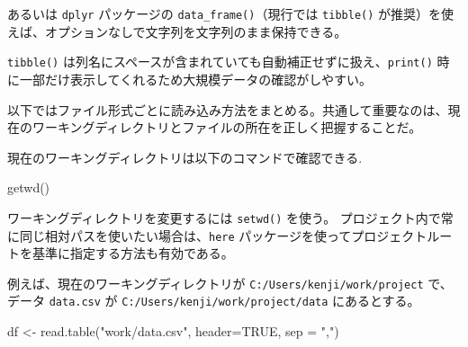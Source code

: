 \documentclass[
  letterpaper,
  xelatex,
  ja=standard, xelatex]{bxjsbook}
\newenvironment{Shaded}{\begin{snugshade}}{\end{snugshade}}
\newcommand{\AttributeTok}[1]{\textcolor[rgb]{0.40,0.45,0.13}{#1}}
\newcommand{\ConstantTok}[1]{\textcolor[rgb]{0.56,0.35,0.01}{#1}}
\newcommand{\DecValTok}[1]{\textcolor[rgb]{0.68,0.00,0.00}{#1}}
\newcommand{\DocumentationTok}[1]{\textcolor[rgb]{0.37,0.37,0.37}{\textit{#1}}}
\newcommand{\FunctionTok}[1]{\textcolor[rgb]{0.28,0.35,0.67}{#1}}
\newcommand{\NormalTok}[1]{\textcolor[rgb]{0.00,0.23,0.31}{#1}}
\newcommand{\OtherTok}[1]{\textcolor[rgb]{0.00,0.23,0.31}{#1}}
\newcommand{\SpecialCharTok}[1]{\textcolor[rgb]{0.37,0.37,0.37}{#1}}
\newcommand{\StringTok}[1]{\textcolor[rgb]{0.13,0.47,0.30}{#1}}
\begin{document}
あるいは \texttt{dplyr} パッケージの \texttt{data\_frame()}（現行では
\texttt{tibble()}
が推奨）を使えば、オプションなしで文字列を文字列のまま保持できる。

\begin{Shaded}
\end{Shaded}

\texttt{tibble()}
は列名にスペースが含まれていても自動補正せずに扱え、\texttt{print()}
時に一部だけ表示してくれるため大規模データの確認がしやすい。

以下ではファイル形式ごとに読み込み方法をまとめる。共通して重要なのは、現在のワーキングディレクトリとファイルの所在を正しく把握することだ。

現在のワーキングディレクトリは以下のコマンドで確認できる.

\begin{Shaded}
\begin{Highlighting}[]
\FunctionTok{getwd}\NormalTok{()}
\end{Highlighting}
\end{Shaded}

ワーキングディレクトリを変更するには \texttt{setwd()} を使う。
プロジェクト内で常に同じ相対パスを使いたい場合は、\texttt{here}
パッケージを使ってプロジェクトルートを基準に指定する方法も有効である。

例えば、現在のワーキングディレクトリが
\texttt{C:/Users/kenji/work/project} で、データ \texttt{data.csv} が
\texttt{C:/Users/kenji/work/project/data} にあるとする。

\begin{Shaded}
\begin{Highlighting}[]
\NormalTok{df }\OtherTok{\textless{}{-}} \FunctionTok{read.table}\NormalTok{(}\StringTok{"work/data.csv"}\NormalTok{, }\AttributeTok{header=}\ConstantTok{TRUE}\NormalTok{, }\AttributeTok{sep =} \StringTok{","}\NormalTok{)}
\end{Highlighting}
\end{Shaded}
\end{document}
